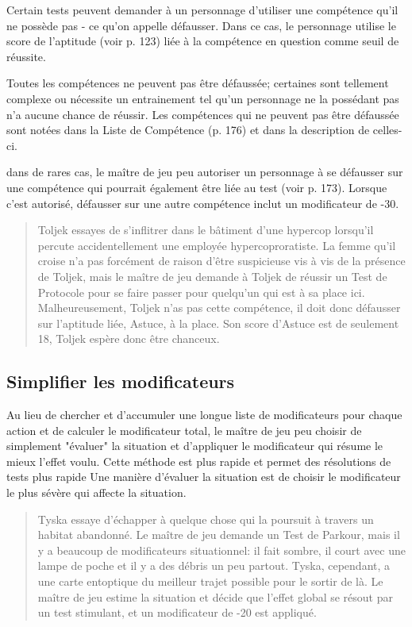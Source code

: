 Certain tests peuvent demander à un personnage d'utiliser une compétence qu'il ne possède pas - ce qu'on appelle défausser. Dans ce cas, le personnage utilise le score de l'aptitude (voir p. 123) liée à la compétence en question comme seuil de réussite. 

Toutes les compétences ne peuvent pas être défaussée; certaines sont tellement complexe ou nécessite un entrainement tel qu'un personnage ne la possédant pas n'a aucune chance de réussir. Les compétences qui ne peuvent pas être défaussée sont notées dans la Liste de Compétence (p. 176) et dans la description de celles-ci. 

dans de rares cas, le maître de jeu peu autoriser un personnage à se défausser sur une compétence qui pourrait également être liée au test (voir p. 173). Lorsque c'est autorisé, défausser sur une autre compétence inclut un modificateur de -30. 

\begin{quotation} Toljek essayes de s'inflitrer dans le bâtiment d'une hypercop lorsqu'il percute accidentellement une employée hypercoproratiste. La femme qu'il croise n'a pas forcément de raison d'être suspicieuse vis à vis de la présence de Toljek, mais le maître de jeu demande à Toljek de réussir un Test de Protocole pour se faire passer pour quelqu'un qui est à sa place ici. Malheureusement, Toljek n'as pas cette compétence, il doit donc défausser sur l'aptitude liée, Astuce, à la place. Son score d'Astuce est de seulement 18, Toljek espère donc être chanceux. \end{quotation} 

\subsection{Simplifier les modificateurs} \label{sec:simpl-modif} 

Au lieu de chercher et d'accumuler une longue liste de modificateurs pour chaque action et de calculer le modificateur total, le maître de jeu peu choisir de simplement "évaluer" la situation et d'appliquer le modificateur qui résume le mieux l'effet voulu. Cette méthode est plus rapide et permet des résolutions de tests plus rapide Une manière d'évaluer la situation est de choisir le modificateur le plus sévère qui affecte la situation. 

\begin{quotation} Tyska essaye d'échapper à quelque chose qui la poursuit à travers un habitat abandonné. Le maître de jeu demande un Test de Parkour, mais il y a beaucoup de modificateurs situationnel: il fait sombre, il court avec une lampe de poche et il y a des débris un peu partout. Tyska, cependant, a une carte entoptique du meilleur trajet possible pour le sortir de là. Le maître de jeu estime la situation et décide que l'effet global se résout par un test stimulant, et un modificateur de -20 est appliqué. \end{quotation} 

